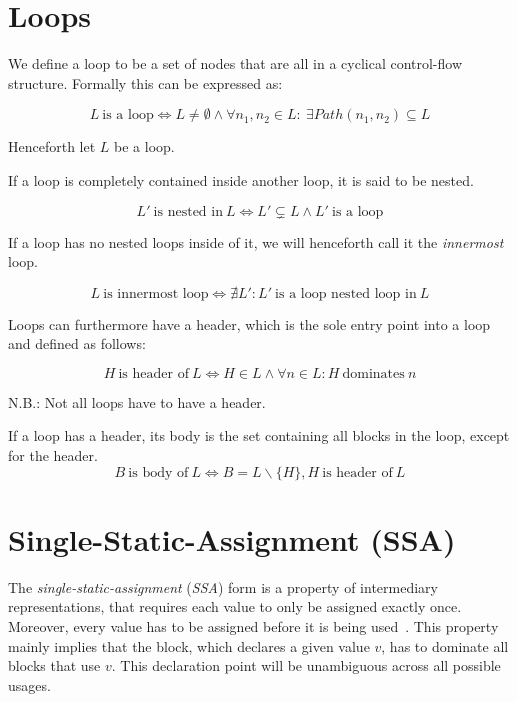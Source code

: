 
\section{Loops}\label{sec:basics:loops}

We define a loop to be a set of nodes that are all in a cyclical control-flow structure.
Formally this can be expressed as:

$$L~\text{is a loop} \Longleftrightarrow L \neq \emptyset \wedge \forall n_1, n_2 \in L:~\exists Path(n_1, n_2) \subseteq L$$

Henceforth let $L$ be a loop.

If a loop is completely contained inside another loop, it is said to be nested.

$$L'~\text{is nested in}~L \Longleftrightarrow L' \subsetneq L \wedge L'~\text{is a loop}$$

If a loop has no nested loops inside of it, we will henceforth call it the \textit{innermost} loop.

$$L~\text{is innermost loop} \Longleftrightarrow \nexists L': L'~\text{is a loop nested loop in}~L$$

Loops can furthermore have a header, which is the sole entry point into a loop~\cite{aebi18bachelorarbeit} and defined as follows:

$$H~\text{is header of}~L \Longleftrightarrow H \in L \wedge \forall n \in L: H~\text{dominates}~n$$

N.B.: Not all loops have to have a header.

If a loop has a header, its body is the set containing all blocks in the loop, except for the header.
$$B~\text{is body of}~L \Longleftrightarrow B = L \backslash \{H\}, H~\text{is header of}~L$$

\section{Single-Static-Assignment (SSA)}\label{sec:basics:ssa}

The \textit{single-static-assignment} (\textit{SSA}) form is a property of intermediary representations, that requires each value to only be assigned exactly once.
Moreover, every value has to be assigned before it is being used~\cite{cytron91}.
This property mainly implies that the block, which declares a given value $v$, has to dominate all blocks that use $v$.
This declaration point will be unambiguous across all possible usages.

